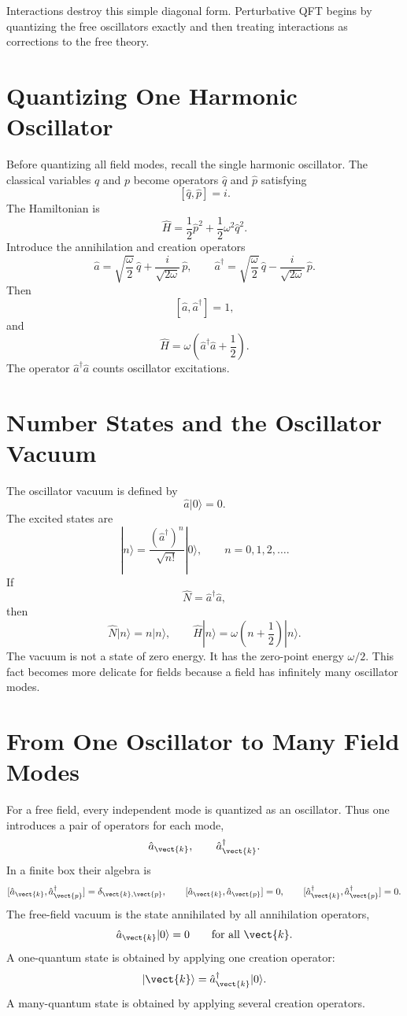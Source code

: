 \begin{remarkbox}
Interactions destroy this simple diagonal form. Perturbative QFT begins by
quantizing the free oscillators exactly and then treating interactions as
corrections to the free theory.
\end{remarkbox}

\section{Quantizing One Harmonic Oscillator}

Before quantizing all field modes, recall the single harmonic oscillator. The
classical variables \(q\) and \(p\) become operators \(\hat q\) and \(\hat p\)
satisfying
\[
    [\hat q,\hat p]=i.
\]
The Hamiltonian is
\[
    \hat H
    = \frac{1}{2}\hat p^2
      + \frac{1}{2}\omega^2\hat q^2.
\]
Introduce the annihilation and creation operators
\[
    \hat a
    = \sqrt{\frac{\omega}{2}}\,\hat q
      + \frac{i}{\sqrt{2\omega}}\,\hat p,
    \qquad
    \hat a^\dagger
    = \sqrt{\frac{\omega}{2}}\,\hat q
      - \frac{i}{\sqrt{2\omega}}\,\hat p.
\]
Then
\[
    [\hat a,\hat a^\dagger]=1,
\]
and
\[
    \hat H
    = \omega\left(\hat a^\dagger\hat a+\frac{1}{2}\right).
\]
The operator \(\hat a^\dagger\hat a\) counts oscillator excitations.

\section{Number States and the Oscillator Vacuum}

The oscillator vacuum is defined by
\[
    \hat a|0\rangle=0.
\]
The excited states are
\[
    |n\rangle
    = \frac{(\hat a^\dagger)^n}{\sqrt{n!}}|0\rangle,
    \qquad n=0,1,2,\ldots.
\]
If
\[
    \hat N=\hat a^\dagger\hat a,
\]
then
\[
    \hat N|n\rangle=n|n\rangle,
    \qquad
    \hat H|n\rangle
    = \omega\left(n+\frac{1}{2}\right)|n\rangle.
\]
The vacuum is not a state of zero energy. It has the zero-point energy
\(\omega/2\). This fact becomes more delicate for fields because a field has
infinitely many oscillator modes.

\section{From One Oscillator to Many Field Modes}

For a free field, every independent mode is quantized as an oscillator. Thus one
introduces a pair of operators for each mode,
\[
    \hat a_{\vect{k}},
    \qquad
    \hat a_{\vect{k}}^\dagger.
\]
In a finite box their algebra is
\[
    [\hat a_{\vect{k}},\hat a_{\vect{p}}^\dagger]
    = \delta_{\vect{k},\vect{p}},
    \qquad
    [\hat a_{\vect{k}},\hat a_{\vect{p}}]=0,
    \qquad
    [\hat a_{\vect{k}}^\dagger,\hat a_{\vect{p}}^\dagger]=0.
\]
The free-field vacuum is the state annihilated by all annihilation operators,
\[
    \hat a_{\vect{k}}|0\rangle=0
    \qquad \text{for all }\vect{k}.
\]
A one-quantum state is obtained by applying one creation operator:
\[
    |\vect{k}\rangle
    = \hat a_{\vect{k}}^\dagger|0\rangle.
\]
A many-quantum state is obtained by applying several creation operators.

